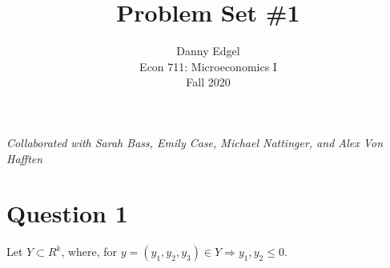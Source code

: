 \documentclass{article}
\begin{document}
\title{	Problem Set \#1 }
\author{ 	Danny Edgel 					\\ 
			Econ 711: Microeconomics I		\\
			Fall 2020						\\
		}
\maketitle\thispagestyle{empty}

\textit{Collaborated with Sarah Bass, Emily Case, Michael Nattinger, and Alex Von Hafften}


\section*{Question 1}
Let $Y\subset R^k$, where, for $y=(y_1,y_2,y_3)\in Y\Rightarrow y_1,y_2\leq0$.
\end{document}
